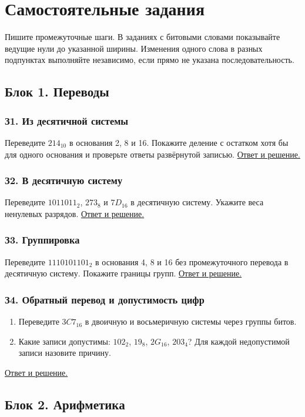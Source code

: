 \chapter{Самостоятельные задания}
Пишите промежуточные шаги. В заданиях с битовыми словами показывайте ведущие нули до указанной ширины. Изменения одного слова в разных подпунктах выполняйте независимо, если прямо не указана последовательность.

\section{Блок 1. Переводы}
\subsection*{З1. Из десятичной системы}\label{task:z1}
Переведите $214_{10}$ в основания 2, 8 и 16. Покажите деление с остатком хотя бы для одного основания и проверьте ответы развёрнутой записью.
\hyperref[ans:z1]{Ответ и решение.}

\subsection*{З2. В десятичную систему}\label{task:z2}
Переведите $1011011_2$, $273_8$ и $7D_{16}$ в десятичную систему. Укажите веса ненулевых разрядов.
\hyperref[ans:z2]{Ответ и решение.}

\subsection*{З3. Группировка}\label{task:z3}
Переведите $1110101101_2$ в основания 4, 8 и 16 без промежуточного перевода в десятичную систему. Покажите границы групп.
\hyperref[ans:z3]{Ответ и решение.}

\subsection*{З4. Обратный перевод и допустимость цифр}\label{task:z4}
\begin{enumerate}
    \item Переведите $3C7_{16}$ в двоичную и восьмеричную системы через группы битов.
    \item Какие записи допустимы: $102_2$, $19_8$, $2G_{16}$, $203_4$? Для каждой недопустимой записи назовите причину.
\end{enumerate}
\hyperref[ans:z4]{Ответ и решение.}

\section{Блок 2. Арифметика}
